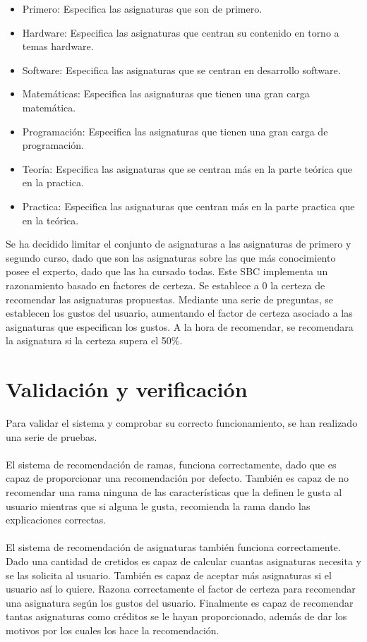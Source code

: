 \begin{itemize}
   \item Primero: Especifica las asignaturas que son de primero.
   \item Hardware: Especifica las asignaturas que centran su contenido en torno a temas hardware.
   \item Software: Especifica las asignaturas que se centran en desarrollo software.
   \item Matemáticas: Especifica las asignaturas que tienen una gran carga matemática.
   \item Programación: Especifica las asignaturas que tienen una gran carga de programación.
   \item Teoría: Especifica las asignaturas que se centran más en la parte teórica que en la practica.
   \item Practica: Especifica las asignaturas que centran más en la parte practica que en la teórica.
\end{itemize}

Se ha decidido limitar el conjunto de asignaturas a las asignaturas de primero y segundo curso, dado que son las asignaturas sobre las que más conocimiento posee el experto, dado que las ha cursado todas.
Este SBC implementa un razonamiento basado en factores de certeza. Se establece a 0 la certeza de recomendar las asignaturas propuestas. Mediante una serie de preguntas, se establecen los gustos del usuario, aumentando el factor de certeza asociado a las asignaturas que especifican los gustos. A la hora de recomendar, se recomendara la asignatura si la certeza supera el 50\%.

\section{Validación y verificación}
Para validar el sistema y comprobar su correcto funcionamiento, se han realizado una serie de pruebas.
\\\\
El sistema de recomendación de ramas, funciona correctamente, dado que es capaz de proporcionar una recomendación por defecto. También es capaz de no recomendar una rama ninguna de las características que la definen le gusta al usuario mientras que si alguna le gusta, recomienda la rama dando las explicaciones correctas.
\\\\
El sistema de recomendación de asignaturas también funciona correctamente. Dado una cantidad de cretidos es capaz de calcular cuantas asignaturas necesita y se las solicita al usuario. También es capaz de aceptar más asignaturas si el usuario así lo quiere. Razona correctamente el factor de certeza para recomendar una asignatura según los gustos del usuario. Finalmente es capaz de recomendar tantas asignaturas como créditos se le hayan proporcionado, además de dar los motivos por los cuales los hace la recomendación.

